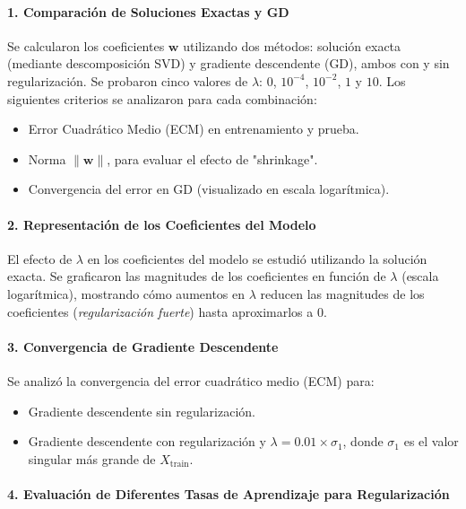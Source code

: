 \documentclass{tp02}
\begin{document}
\paragraph{1. Comparación de Soluciones Exactas y GD}
Se calcularon los coeficientes $\mathbf{w}$ utilizando dos métodos: 
solución exacta (mediante descomposición SVD) y gradiente descendente 
(GD), ambos con y sin regularización. Se probaron cinco valores de 
$\lambda$: $0$, $10^{-4}$, $10^{-2}$, $1$ y $10$. Los siguientes 
criterios se analizaron para cada combinación:
\begin{itemize}
    \item Error Cuadrático Medio (ECM) en entrenamiento y prueba.
    \item Norma $\|\mathbf{w}\|$, para evaluar el efecto de 
    "shrinkage".
    \item Convergencia del error en GD (visualizado en escala 
    logarítmica).
\end{itemize}

\paragraph{2. Representación de los Coeficientes del Modelo}
El efecto de $\lambda$ en los coeficientes del modelo se estudió 
utilizando la solución exacta. Se graficaron las magnitudes de los 
coeficientes en función de $\lambda$ (escala logarítmica), mostrando 
cómo aumentos en $\lambda$ reducen las magnitudes de los coeficientes 
(\textit{regularización fuerte}) hasta aproximarlos a $0$.

\paragraph{3. Convergencia de Gradiente Descendente}
Se analizó la convergencia del error cuadrático medio (ECM) para:
\begin{itemize}
    \item Gradiente descendente sin regularización.
    \item Gradiente descendente con regularización y $\lambda = 
    0.01 \times \sigma_1$, donde $\sigma_1$ es el valor singular más 
    grande de $X_{\text{train}}$.
\end{itemize}


\paragraph{4. Evaluación de Diferentes Tasas de Aprendizaje para Regularización}
\end{document}
